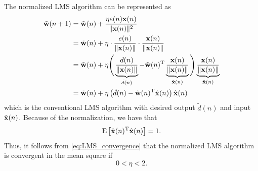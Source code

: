\begin{enumerate}
  \begin{solution}

    The normalized LMS algorithm can be represented as
    \begin{align*}
      \tilde{\mathbf{w}}(n+1) &= \tilde{\mathbf{w}}(n) +\frac{\eta e(n)
        \mathbf{x}(n)} {\| \mathbf{x}(n) \|^2}
      \\
      &= \tilde{\mathbf{w}}(n) + \eta \cdot
      \frac{e(n)}{\|\mathbf{x}(n)\|} \cdot
      \frac{\mathbf{x}(n)}{\|\mathbf{x}(n)\|}
      \\
      &= \tilde{\mathbf{w}}(n) + \eta \Bigg(
        \underbrace{\frac{d(n)}{\|\mathbf{x}(n)\|}}_{\tilde{d}(n)} -
        \tilde{\mathbf{w}}(n)^{\mathrm{T}}
        \underbrace{\frac{\mathbf{x}(n)}{\|\mathbf{x}(n)\|}}_{\Hat{\mathbf{x}}(n)} \Bigg)
      \underbrace{\frac{\mathbf{x}(n)}{\|\mathbf{x}(n)\|}}_{\Hat{\mathbf{x}}(n)}
      \\
      &= \tilde{\mathbf{w}}(n) + \eta \left( \tilde{d}(n) -
      \tilde{\mathbf{w}}(n)^{\mathrm{T}} \Hat{\mathbf{x}}(n) \right) \Hat{\mathbf{x}}(n)
    \end{align*}
    which is the conventional LMS algorithm with desired output
    $\tilde{d}(n)$ and input $\Hat{\mathbf{x}}(n)$. Because of the
    normalization, we have that
    \begin{equation*}
      \mathrm{E}\left[\Hat{\mathbf{x}}(n)^{\mathrm{T}}\Hat{\mathbf{x}}(n)\right] = 1.
    \end{equation*}
    Thus, it follows from \eqref{eq:LMS_convergence} that the
    normalized LMS algorithm is convergent in the mean square if
    \begin{equation*}
      0 < \eta < 2.
    \end{equation*}
    
    




\end{solution}
\end{enumerate}
